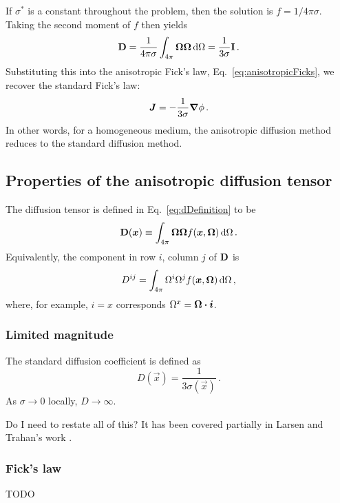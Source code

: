If $\sigma^*$ is a constant throughout the problem, then the solution is
$f=1/4\pi\sigma$. Taking the second moment of $f$ then yields
\begin{equation*}
  \mathbf{D} = \frac{1}{4\pi\sigma} \int_{4\pi} \bm{\Omega} \bm{\Omega} \mathop{}\!\mathrm{d} \Omega
  = \frac{1}{3\sigma} \mathbf{I}\,.
\end{equation*}
Substituting this into the anisotropic Fick's law,
Eq.~\eqref{eq:anisotropicFicks}, we recover the standard Fick's law:
\begin{equation*}
  \bm{J} = - \frac{1}{3\sigma} \bm{\nabla} \phi\,.
\end{equation*}
In other words, for a homogeneous medium, the anisotropic diffusion method
reduces to the standard diffusion method.

\subsection{Properties of the anisotropic diffusion tensor}
The diffusion tensor is defined in Eq.~\eqref{eq:dDefinition} to be
\begin{equation*}
  \mathbf{D}(\bm{x}) \equiv \int_{4\pi} \bm{\Omega} \bm{\Omega}
  f(\bm{x}, \bm{\Omega}) \mathop{}\!\mathrm{d}\Omega \,.
\end{equation*}
Equivalently, the component in row $i$, column $j$ of $\mathbf{D}$ is
\begin{equation}\label{eq:dij}
  D^{ij} = \int_{4\pi} \Omega^i \Omega^j
  f(\bm{x}, \bm{\Omega}) \mathop{}\!\mathrm{d}\Omega \,,
\end{equation}
where, for example, $i=x$ corresponds $\Omega^x = \bm{\Omega} \bm{\cdot} \bm{i}$.

\subsubsection{Limited magnitude}
The standard diffusion coefficient is defined as
\begin{equation*}
  D(\vec{x}) = \frac{1}{3\sigma(\vec{x})} \,.
\end{equation*}
As $\sigma\to0$ locally, $D\to \infty$.

Do I need to restate all of this? It has been covered partially in Larsen and
Trahan's work \cite{Lar2009c}.

\subsubsection{Fick's law}
TODO

